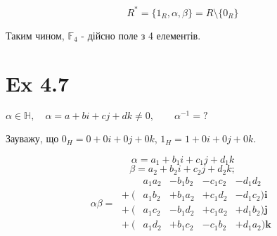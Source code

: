 \documentclass[11pt, a4paper]{article} %
\newcommand{\F}{\mathbb{F}}
\begin{document}
\[R^* = \{1_R, \alpha, \beta\} = R\setminus \{0_R\}\]

Таким чином, $\F_4$ - дійсно поле з 4 елементів.

\section*{Ex 4.7}
\begin{mdframed}
    $\alpha \in \mathbb H, \quad \alpha = a+bi+cj+dk \ne 0, \qquad \alpha^{-1} = ?$
\end{mdframed}

Зауважу, що $0_H = 0 + 0i + 0j + 0k$, $1_H = 1 + 0i + 0j + 0k$.



\[\alpha = a_1+b_1i+c_1j+d_1k\]
\[\beta = a_2+b_2i+c_2j+d_2k;\]
\[\alpha\beta = 
\begin{matrix}
    {}&a_{1}a_{2}&-b_{1}b_{2}&-c_{1}c_{2}&-d_{1}d_{2}\\
    {}+{}(&a_{1}b_{2}&+b_{1}a_{2}&+c_{1}d_{2}&-d_{1}c_{2})\mathbf{i} \\
    {}+{}(&a_{1}c_{2}&-b_{1}d_{2}&+c_{1}a_{2}&+d_{1}b_{2})\mathbf{j} \\
    {}+{}(&a_{1}d_{2}&+b_{1}c_{2}&-c_{1}b_{2}&+d_{1}a_{2})\mathbf{k} 
\end{matrix}
\]

\end{document}
